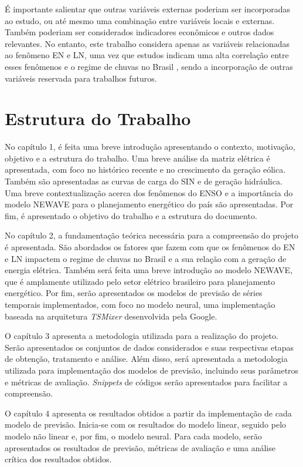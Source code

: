 É importante salientar que outras variáveis externas poderiam ser incorporadas ao estudo, ou até mesmo uma combinação entre
 variáveis locais e externas. Também poderiam ser considerados indicadores econômicos e outros dados relevantes. 
No entanto, este trabalho considera apenas as variáveis relacionadas ao fenômeno EN e LN, uma vez que estudos indicam
uma alta correlação entre esses fenômenos e o regime de chuvas no Brasil \cite{de2012influencia, Andreoli2016}, sendo a 
incorporação de outras variáveis reservada para trabalhos futuros.

\section{Estrutura do Trabalho}
No capítulo 1, é feita uma breve introdução apresentando o contexto, motivação, objetivo e a estrutura do trabalho. Uma
breve análise da matriz elétrica é apresentada, com foco no histórico recente e no crescimento da geração eólica. Também
são apresentadas as curvas de carga do SIN e de geração hidráulica. Uma breve contextualização acerca dos fenômenos do
ENSO e a importância do modelo NEWAVE para o planejamento energético do país são apresentadas. Por fim, é apresentado
o objetivo do trabalho e a estrutura do documento.

No capítulo 2, a fundamentação teórica necessária para a compreensão do projeto é apresentada. São abordados os fatores
que fazem com que os fenômenos do EN e LN impactem o regime de chuvas no Brasil e a sua relação com a geração de 
energia elétrica. Também será feita uma breve introdução ao modelo NEWAVE, que é amplamente utilizado pelo setor elétrico
brasileiro para planejamento energético. Por fim, serão apresentados os modelos de previsão de séries temporais 
implementados, com foco no modelo neural, uma implementação baseada na arquitetura \textit{TSMixer} desenvolvida pela Google.

O capítulo 3 apresenta a metodologia utilizada para a realização do projeto. Serão apresentados os conjuntos de dados
considerados e suas respectivas etapas de obtenção, tratamento e análise. Além disso, será apresentada a metodologia
utilizada para implementação dos modelos de previsão, incluindo seus parâmetros e métricas de avaliação. \textit{Snippets}
de códigos serão apresentados para facilitar a compreensão.

O capítulo 4 apresenta os resultados obtidos a partir da implementação de cada modelo de previsão. Inicia-se com os resultados
do modelo linear, seguido pelo modelo não linear e, por fim, o modelo neural. Para cada modelo, serão apresentados os
resultados de previsão, métricas de avaliação e uma análise crítica dos resultados obtidos.

